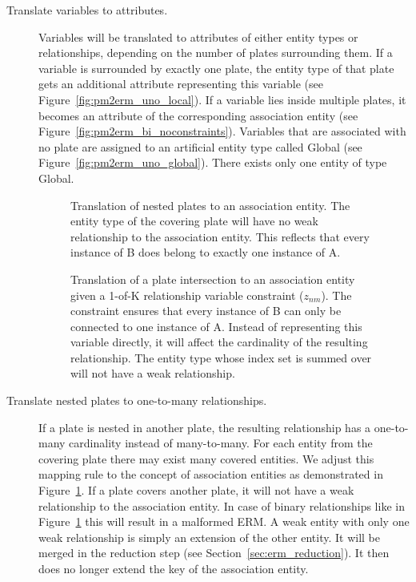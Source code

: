 \begin{description}
\item[Translate variables to attributes.] Variables will be translated to attributes of either entity types or relationships, depending on the number of plates surrounding them. If a variable is surrounded by exactly one plate, the entity type of that plate gets an additional attribute representing this variable (see Figure~\ref{fig:pm2erm_uno_local}). If a variable lies inside multiple plates, it becomes an attribute of the corresponding association entity (see Figure~\ref{fig:pm2erm_bi_noconstraints}). Variables that are associated with no plate are assigned to an artificial entity type called Global (see Figure~\ref{fig:pm2erm_uno_global}). There exists only one entity of type Global.

\begin{figure}[h!]
\centering
\scalebox{\tikzScale}{\adjustTikzSize }
\caption[Translation of nested plates to an ERM]{Translation of nested plates to an association entity. The entity type of the covering plate will have no weak relationship to the association entity. This reflects that every instance of B does belong to exactly one instance of A.}\label{fig:pm2erm_covered_1}
\end{figure}

\begin{figure}[h!]
\centering
\scalebox{\tikzScale}{\adjustTikzSize }
\caption[Translation of plate intersections with 1-of-K variables to an ERM]{Translation of a plate intersection to an association entity given a 1-of-K relationship variable constraint ($z_{nm}$). The constraint ensures that every instance of B can only be connected to one instance of A. Instead of representing this variable directly, it will affect the cardinality of the resulting relationship. The entity type whose index set is summed over will not have a weak relationship.}\label{fig:pm2erm_bi_constraints}
\end{figure}

\item[Translate nested plates to one-to-many relationships.] If a plate is nested in another plate, the resulting relationship has a one-to-many cardinality instead of many-to-many. For each entity from the covering plate there may exist many covered entities. We adjust this mapping rule to the concept of association entities as demonstrated in Figure~\ref{fig:pm2erm_covered_1}. If a plate covers another plate, it will not have a weak relationship to the association entity. In case of binary relationships like in Figure~\ref{fig:pm2erm_covered_1} this will result in a malformed ERM. A weak entity with only one weak relationship is simply an extension of the other entity. It will be merged in the reduction step (see Section~\ref{sec:erm_reduction}). It then does no longer extend the key of the association entity.
\end{description}


